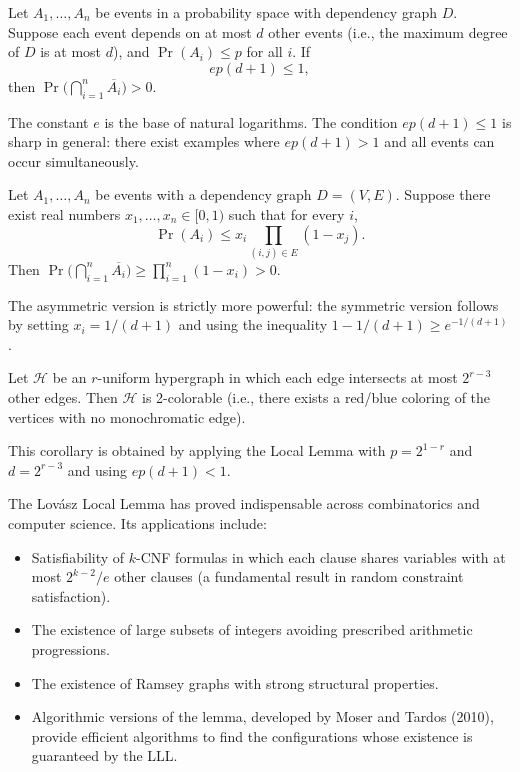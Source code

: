 \begin{theorem}
Let \(A_1, \dots, A_n\) be events in a probability space with dependency graph \(D\). Suppose each event depends on at most \(d\) other events (i.e., the maximum degree of \(D\) is at most \(d\)), and \(\Pr(A_i) \leq p\) for all \(i\). If
\[
e p (d+1) \leq 1,
\]
then \(\Pr\bigl(\bigcap_{i=1}^n \overline{A_i}\bigr) > 0\).
\end{theorem}

The constant \(e\) is the base of natural logarithms. The condition \(ep(d+1) \leq 1\) is sharp in general: there exist examples where \(ep(d+1) > 1\) and all events can occur simultaneously.

\begin{theorem}
Let \(A_1, \dots, A_n\) be events with a dependency graph \(D = (V,E)\). Suppose there exist real numbers \(x_1, \dots, x_n \in [0,1)\) such that for every \(i\),
\[
\Pr(A_i) \leq x_i \prod_{(i,j) \in E} (1 - x_j).
\]
Then \(\Pr\bigl(\bigcap_{i=1}^n \overline{A_i}\bigr) \geq \prod_{i=1}^n (1 - x_i) > 0\).
\end{theorem}

The asymmetric version is strictly more powerful: the symmetric version follows by setting \(x_i = 1/(d+1)\) and using the inequality \(1 - 1/(d+1) \geq e^{-1/(d+1)}\).

\begin{corollary}
Let \(\mathcal{H}\) be an \(r\)-uniform hypergraph in which each edge intersects at most \(2^{r-3}\) other edges. Then \(\mathcal{H}\) is 2-colorable (i.e., there exists a red/blue coloring of the vertices with no monochromatic edge).
\end{corollary}

This corollary is obtained by applying the Local Lemma with \(p = 2^{1-r}\) and \(d = 2^{r-3}\) and using \(e p (d+1) < 1\).

The Lov\'{a}sz Local Lemma has proved indispensable across combinatorics and computer science. Its applications include:
\begin{itemize}
  \item Satisfiability of \(k\)-CNF formulas in which each clause shares variables with at most \(2^{k-2}/e\) other clauses (a fundamental result in random constraint satisfaction).
  \item The existence of large subsets of integers avoiding prescribed arithmetic progressions.
  \item The existence of Ramsey graphs with strong structural properties.
  \item Algorithmic versions of the lemma, developed by Moser and Tardos (2010), provide efficient algorithms to find the configurations whose existence is guaranteed by the LLL.
\end{itemize}

